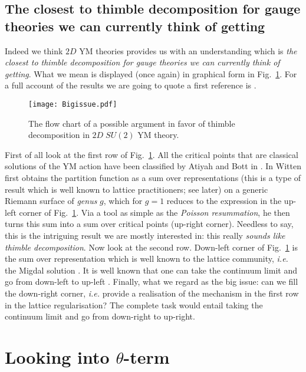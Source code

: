 \documentclass[a4paper,11pt]{article}
\begin{document}
\subsection{The closest to thimble decomposition for gauge theories we can currently
  think of getting}

Indeed we think $2D$ YM theories provides us with an understanding
which is {\em the closest to thimble decomposition for gauge theories we can currently
  think of getting}. What we mean is displayed (once again) in
graphical form in Fig.~\ref{fig:TheBigIssue}. For a full account of
the results we are going to quote a first reference is \cite{Witten:1992xu}.
\begin{figure}[ht] 
\centering
\texttt{[image: Bigissue.pdf]}
\caption{The flow chart of a possible argument in favor of thimble
  decomposition in $2D \; SU(2)$ YM theory.}
\label{fig:TheBigIssue}
\end{figure}
First of all look at the first row of Fig.~\ref{fig:TheBigIssue}. All
the critical points that are classical solutions of the YM action have
been classified by Atiyah and Bott in \cite{AtBott}. In
\cite{Witten:1992xu} Witten first obtains the partition function as a sum
over representations (this is a type of result which is well known to
lattice practitioners; see later) on a generic Riemann surface of {\em genus} $g$,
which for $g=1$ reduces to the expression in the up-left corner of 
Fig.~\ref{fig:TheBigIssue}. Via a tool as simple as the {\em Poisson
  resummation}, he then turns this sum into a sum over critical points
(up-right corner). Needless to say, this is the intriguing result we
are mostly interested in: this really {\em sounds like thimble
  decomposition}. 
Now look at the second row. Down-left corner of
Fig.~\ref{fig:TheBigIssue} is the sum over representation which is
well known to the lattice community, {\em i.e.} the Migdal solution
\cite{Migdal:1975zg}. It is well known that one can take the continuum
limit and go from down-left to up-left \cite{Gonzalez-Arroyo:1981ckv}. 
Finally, what we regard as the big issue: can we fill the down-right
corner, {\em i.e.} provide a realisation of the mechanism in the first row in the 
  lattice regularisation? The complete task would entail taking the
  continuum limit and go from down-right to up-right. 

\section{Looking into $\theta$-term}
\end{document}
